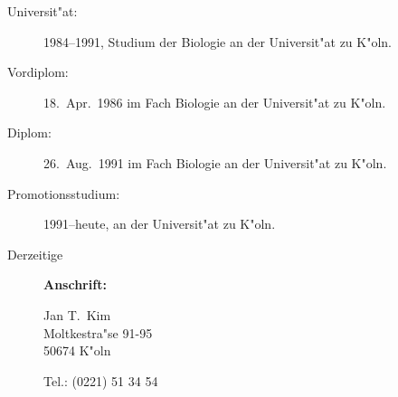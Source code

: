 \begin{appendix}
\begin{description}
\item[Universit"at:] 1984--1991, Studium der Biologie an der Universit"at
    zu K"oln.

\item[Vordiplom:] 18.\ Apr.\ 1986 im Fach Biologie an der Universit"at zu K"oln.

\item[Diplom:] 26.\ Aug.\ 1991 im Fach Biologie an der Universit"at zu K"oln.

\item[Promotionsstudium:] 1991--heute, an der Universit"at zu K"oln.

\item[Derzeitige] {\bf Anschrift:}
{\flushleft
  Jan T.\ Kim \\
  Moltkestra"se 91-95 \\
  50674 K"oln

  Tel.: (0221) 51 34 54 \\
% 
}

\end{description}

\end{appendix}

